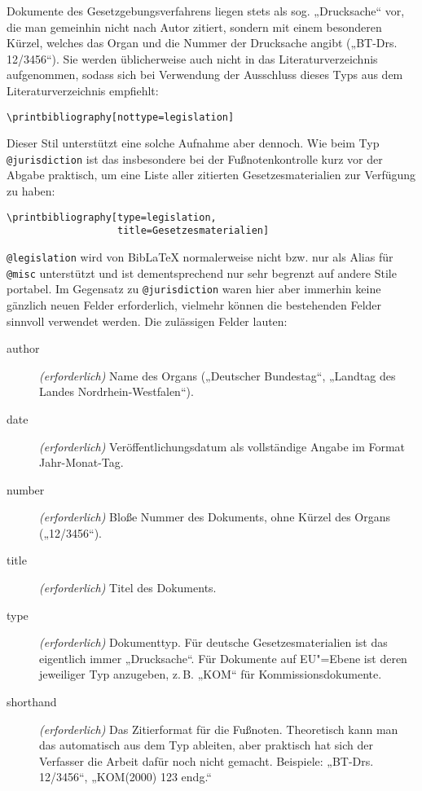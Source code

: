 \documentclass[11pt,a4paper,DIV=calc]{scrartcl}
\newcommand\software[1]{\textsf{#1}}
\newcommand\Biblatex{\software{Bib\LaTeX{}}\xspace}
\newcommand\zB{z.\,B.\xspace}
\begin{document}
Dokumente des Gesetzgebungsverfahrens liegen stets als sog.
„Drucksache“ vor, die man gemeinhin nicht nach Autor zitiert, sondern
mit einem besonderen Kürzel, welches das Organ und die Nummer der
Drucksache angibt („BT-Drs. 12/3456“). Sie werden üblicherweise auch
nicht in das Literaturverzeichnis aufgenommen, sodass sich bei
Verwendung der Ausschluss dieses Typs aus dem Literaturverzeichnis
empfiehlt:

\begin{verbatim}
\printbibliography[nottype=legislation]
\end{verbatim}

Dieser Stil unterstützt eine solche Aufnahme aber dennoch. Wie beim
Typ \verb+@jurisdiction+ ist das insbesondere bei der
Fußnotenkontrolle kurz vor der Abgabe praktisch, um eine Liste aller
zitierten Gesetzesmaterialien zur Verfügung zu haben:

\begin{verbatim}
\printbibliography[type=legislation,
                   title=Gesetzesmaterialien]
\end{verbatim}

\verb+@legislation+ wird von \Biblatex normalerweise nicht
bzw. nur als Alias für \verb+@misc+ unterstützt und ist
dementsprechend nur sehr begrenzt auf andere Stile portabel. Im
Gegensatz zu \verb+@jurisdiction+ waren hier aber immerhin keine
gänzlich neuen Felder erforderlich, vielmehr können die bestehenden
Felder sinnvoll verwendet werden. Die zulässigen Felder lauten:

\begin{description}
\item[author] \emph{(erforderlich)} Name des Organs („Deutscher
  Bundestag“, „Landtag des Landes Nordrhein-Westfalen“).
\item[date] \emph{(erforderlich)} Veröffentlichungsdatum als
  vollständige Angabe im Format Jahr-Monat-Tag.
\item[number] \emph{(erforderlich)} Bloße Nummer des Dokuments, ohne
  Kürzel des Organs („12/3456“).
\item[title] \emph{(erforderlich)} Titel des Dokuments.
\item[type] \emph{(erforderlich)} Dokumenttyp. Für deutsche
  Gesetzesmaterialien ist das eigentlich immer „Drucksache“. Für
  Dokumente auf EU"=Ebene ist deren jeweiliger Typ anzugeben, \zB
  „KOM“ für Kommissionsdokumente.
\item[shorthand] \emph{(erforderlich)} Das Zitierformat für die
  Fußnoten. Theoretisch kann man das automatisch aus dem Typ ableiten,
  aber praktisch hat sich der Verfasser die Arbeit dafür noch nicht
  gemacht. Beispiele: „BT-Drs. 12/3456“, „KOM(2000) 123 endg.“
\end{description}
\end{document}
